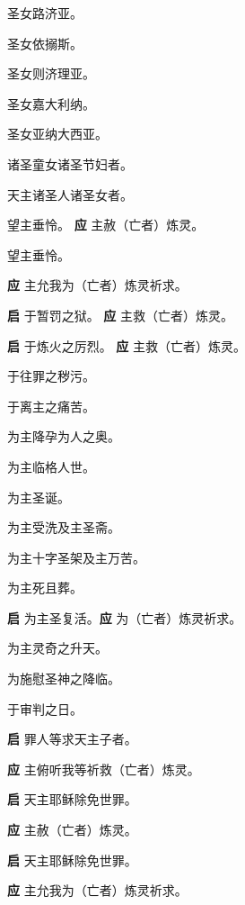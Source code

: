 \documentclass[UTF8,17pt]{ctexart}
\begin{document}
 圣⼥路济亚。

 圣⼥依搦斯。

 圣⼥则济理亚。

 圣⼥嘉⼤利纳。

 圣⼥亚纳⼤西亚。

 诸圣童⼥诸圣节妇者。

 天主诸圣⼈诸圣⼥者。

 望主垂怜。 \hfill \textbf{应} \quad 主赦（亡者）炼灵。

 望主垂怜。

\textbf{应} \quad 主允我为（亡者）炼灵祈求。

\textbf{启} \quad 于暂罚之狱。 \hfill \textbf{应} \quad 主救（亡者）炼灵。

\textbf{启} \quad 于炼⽕之厉烈。 \hfill \textbf{应} \quad 主救（亡者）炼灵。

 于往罪之秽污。

 于离主之痛苦。

 为主降孕为⼈之奥。

 为主临格⼈世。

 为主圣诞。

 为主受洗及主圣斋。

 为主⼗字圣架及主万苦。

 为主死且葬。

\textbf{启} \quad 为主圣复活。\hfill \textbf{应} \quad 为（亡者）炼灵祈求。

 为主灵奇之升天。

 为施慰圣神之降临。

 于审判之⽇。

\textbf{启} \quad 罪⼈等求天主⼦者。

\textbf{应} \quad 主俯听我等祈救（亡者）炼灵。

\textbf{启} \quad 天主耶稣除免世罪。

\textbf{应} \quad 主赦（亡者）炼灵。

\textbf{启} \quad 天主耶稣除免世罪。

\textbf{应} \quad 主允我为（亡者）炼灵祈求。
\end{document}
